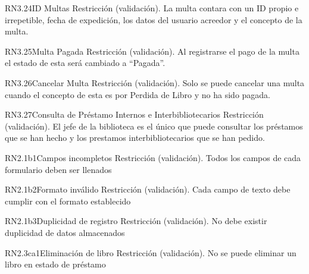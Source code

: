 \begin{BussinesRule}{RN3.24}{ID Multas} 
	\BRitem[Tipo:] Restricción (validación).
	\BRitem[Descripción:]La multa contara con un ID propio e irrepetible, fecha de expedición, los datos del usuario acreedor y el concepto de la multa.


\end{BussinesRule}

\begin{BussinesRule}{RN3.25}{Multa Pagada} 
	\BRitem[Tipo:] Restricción (validación).
	\BRitem[Descripción:]Al registrarse el pago de la multa el estado de esta será cambiado a “Pagada”.
\end{BussinesRule}

\begin{BussinesRule}{RN3.26}{Cancelar Multa} 
	\BRitem[Tipo:] Restricción (validación).
	\BRitem[Descripción:]Solo se puede cancelar una multa cuando el concepto de esta es por Perdida de Libro y no ha sido pagada.
\end{BussinesRule}

\begin{BussinesRule}{RN3.27}{Consulta de Préstamo Internos e Interbibliotecarios} 
	\BRitem[Tipo:] Restricción (validación).
	\BRitem[Descripción:]El jefe de la biblioteca es el único que puede consultar los préstamos que se han hecho y los prestamos interbibliotecarios que se han pedido.
\end{BussinesRule}



\begin{BussinesRule}{RN2.1b1}{Campos incompletos} 
	\BRitem[Tipo:] Restricción (validación).
	\BRitem[Descripción:] Todos los campos de cada formulario deben ser llenados
\end{BussinesRule}


\begin{BussinesRule}{RN2.1b2}{Formato inválido} 
	\BRitem[Tipo:] Restricción (validación).
	\BRitem[Descripción:] Cada campo de texto debe cumplir con el formato establecido
\end{BussinesRule}


\begin{BussinesRule}{RN2.1b3}{Duplicidad de registro} 
	\BRitem[Tipo:] Restricción (validación).
	\BRitem[Descripción:] No debe existir duplicidad de datos almacenados
\end{BussinesRule}

\begin{BussinesRule}{RN2.3ca1}{Eliminación de libro} 
	\BRitem[Tipo:] Restricción (validación).
	\BRitem[Descripción:] No se puede eliminar un libro en estado de préstamo
\end{BussinesRule}

